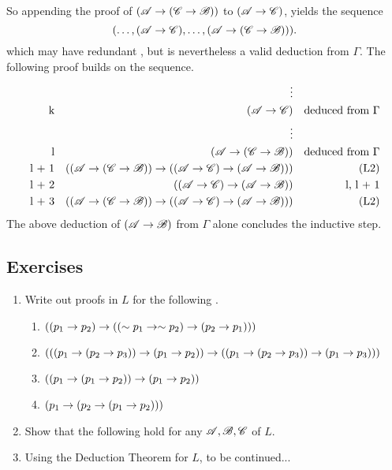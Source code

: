 \begin{proposition}
\begin{enumerate}
    So appending the proof of \((\mathscr{A} \rightarrow (\mathscr{C} \rightarrow \mathscr{B}))\) to \((\mathscr{A} \rightarrow \mathscr{C})\), yields the sequence
      \[(\dots, (\mathscr{A} \rightarrow \mathscr{C}), \dots, (\mathscr{A} \rightarrow (\mathscr{C} \rightarrow \mathscr{B}))).\]
    which may have redundant \wfs{}, but is nevertheless a valid deduction from \(\Gamma\). The following proof builds on the sequence.
    \begin{align*}
      &&
      \vdots&&
      \\
      \text{k}&&
      (\mathscr{A} \rightarrow \mathscr{C})&&
      \text{deduced from \(\Gamma\)}\\
      &&
      \vdots&&
      \\
      \text{l}&&
      (\mathscr{A} \rightarrow (\mathscr{C} \rightarrow \mathscr{B}))&&
      \text{deduced from \(\Gamma\)}\\
      \text{l + 1}&&
      ((\mathscr{A} \rightarrow (\mathscr{C} \rightarrow \mathscr{B})) \rightarrow ((\mathscr{A} \rightarrow \mathscr{C}) \rightarrow (\mathscr{A} \rightarrow \mathscr{B})))&&
      \text{(L2)}\\
      \text{l + 2}&&
      ((\mathscr{A} \rightarrow \mathscr{C}) \rightarrow (\mathscr{A} \rightarrow \mathscr{B}))&&
      \text{l, l + 1}\\
      \text{l + 3}&&
      ((\mathscr{A} \rightarrow (\mathscr{C} \rightarrow \mathscr{B})) \rightarrow ((\mathscr{A} \rightarrow \mathscr{C}) \rightarrow (\mathscr{A} \rightarrow \mathscr{B})))&&
      \text{(L2)}\\
    \end{align*}
    The above deduction of \((\mathscr{A} \rightarrow \mathscr{B})\) from \(\Gamma\) alone concludes the inductive step.
  \end{enumerate}
\end{proposition}

\subsection*{Exercises}

\begin{enumerate}
  \item Write out proofs in \(L\) for the following \wfs.

    \begin{enumerate}[label=(\alph*)]
      \item \(((p_1 \rightarrow p_2) \rightarrow ((\sim p_1 \rightarrow \sim p_2) \rightarrow (p_2 \rightarrow p_1)))\)
      \item \((((p_1 \rightarrow (p_2 \rightarrow p_3)) \rightarrow (p_1 \rightarrow p_2)) \rightarrow ((p_1 \rightarrow (p_2 \rightarrow p_3)) \rightarrow (p_1 \rightarrow p_3)))\)
      \item \(((p_1 \rightarrow (p_1 \rightarrow p_2)) \rightarrow (p_1 \rightarrow p_2))\)
      \item \((p_1 \rightarrow (p_2 \rightarrow (p_1 \rightarrow p_2)))\)
    \end{enumerate}

  \item Show that the following hold for any \wfs{} \(\mathscr{A}, \mathscr{B}, \mathscr{C}\) of \(L\).

  \item Using the Deduction Theorem for \(L\), to be continued...
\end{enumerate}

